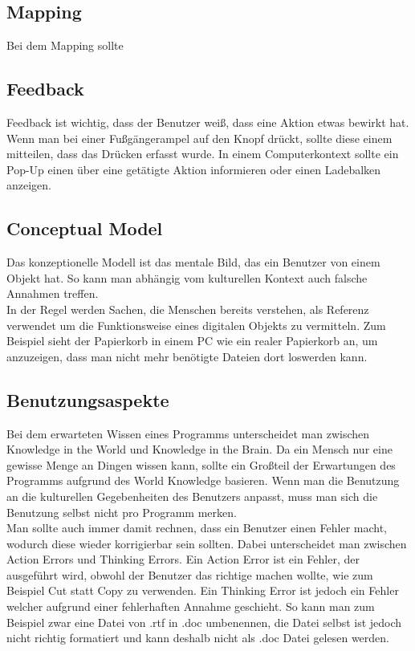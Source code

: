 \documentclass{article}
\begin{document}
	\subsection{Mapping}
	Bei dem Mapping sollte
	\subsection{Feedback}
	Feedback ist wichtig, dass der Benutzer weiß, dass eine Aktion etwas bewirkt hat. Wenn man bei einer Fußgängerampel auf den Knopf drückt, sollte diese einem mitteilen, dass das Drücken erfasst wurde. In einem Computerkontext sollte ein Pop-Up einen über eine getätigte Aktion informieren oder einen Ladebalken anzeigen.
	\subsection{Conceptual Model}
	Das konzeptionelle Modell ist das mentale Bild, das ein Benutzer von einem Objekt hat. So kann man abhängig vom kulturellen Kontext auch falsche Annahmen treffen. \\
	In der Regel werden Sachen, die Menschen bereits verstehen, als Referenz verwendet um die Funktionsweise eines digitalen Objekts zu vermitteln. Zum Beispiel sieht der Papierkorb in einem PC wie ein realer Papierkorb an, um anzuzeigen, dass man nicht mehr benötigte Dateien dort loswerden kann.
	\subsection{Benutzungsaspekte}
	Bei dem erwarteten Wissen eines Programms unterscheidet man zwischen Knowledge in the World und Knowledge in the Brain. Da ein Mensch nur eine gewisse Menge an Dingen wissen kann, sollte ein Großteil der Erwartungen des Programms aufgrund des World Knowledge basieren. Wenn man die Benutzung an die kulturellen Gegebenheiten des Benutzers anpasst, muss man sich die Benutzung selbst nicht pro Programm merken. \\
	Man sollte auch immer damit rechnen, dass ein Benutzer einen Fehler macht, wodurch diese wieder korrigierbar sein sollten. Dabei unterscheidet man zwischen Action Errors und Thinking Errors. Ein Action Error ist ein Fehler, der ausgeführt wird, obwohl der Benutzer das richtige machen wollte, wie zum Beispiel Cut statt Copy zu verwenden. Ein Thinking Error ist jedoch ein Fehler welcher aufgrund einer fehlerhaften Annahme geschieht. So kann man zum Beispiel zwar eine Datei von .rtf in .doc umbenennen, die Datei selbst ist jedoch nicht richtig formatiert und kann deshalb nicht als .doc Datei gelesen werden.
\end{document}
